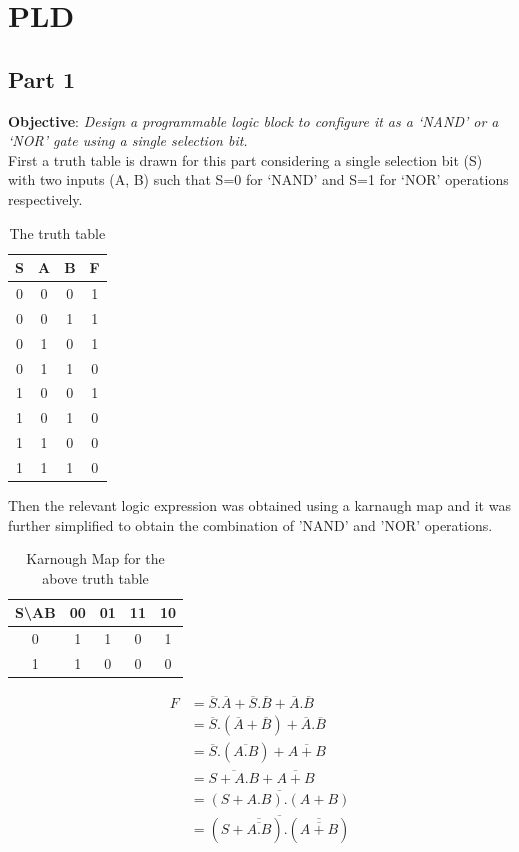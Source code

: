 \documentclass[a4paper,11pt]{article}%
\begin{document}
\pagebreak
\section{PLD}
\subsection{Part 1}
\textbf{Objective}: \textit{Design a programmable logic block to configure it as a `NAND' or a `NOR' gate using a single selection bit.}\\

First a truth table is drawn for this part considering a single selection bit (S) with two inputs (A, B) such that S=0 for ‘NAND’ and S=1 for ‘NOR’ operations respectively.
\begin{table}[H]
	\centering
	\begin{tabular}{|c |c| c| c|}
		\hline
		S & A & B & F \\\hline
		0 & 0 & 0 & 1 \\
		0 & 0 & 1 & 1 \\
		0 & 1 & 0 & 1 \\
		0 & 1 & 1 & 0 \\\hline
		1 & 0 & 0 & 1 \\
		1 & 0 & 1 & 0 \\
		1 & 1 & 0 & 0 \\
		1 & 1 & 1 & 0 \\\hline\hline
	\end{tabular}
\caption{The truth table}
\end{table}

Then the relevant logic expression was obtained using a karnaugh map and it was further simplified to obtain the combination of 'NAND' and 'NOR' operations.

\begin{table}[H]
	\centering
	\begin{tabular}{c |c| c| c| c}
		S\textbackslash AB & 00 & 01 & 11 & 10\\\hline
		0 & 1 & 1 & 0 & 1\\\hline
		1 & 1 & 0  &0  & 0
	\end{tabular}
	\caption{Karnough Map for the above truth table}
\end{table}

\[
\begin{split}
	F &= \overline{S}.\overline{A} + \overline{S}.\overline{B} + \overline{A}.\overline{B}\\
	&= \overline{S}.(\overline{A}+\overline{B}) + \overline{A}.\overline{B}\\
	&= \overline{S}.(\overline{A.B}) + \overline{A+B}\\
	&= \overline{S+A.B} + \overline{A+B}\\
	& = \overline{(S + A.B).(A+B)}\\
	& =\overline{(S + \overline{\overline{A.B}}).(\overline{\overline{A+B}})}
\end{split}
\]
\end{document}
